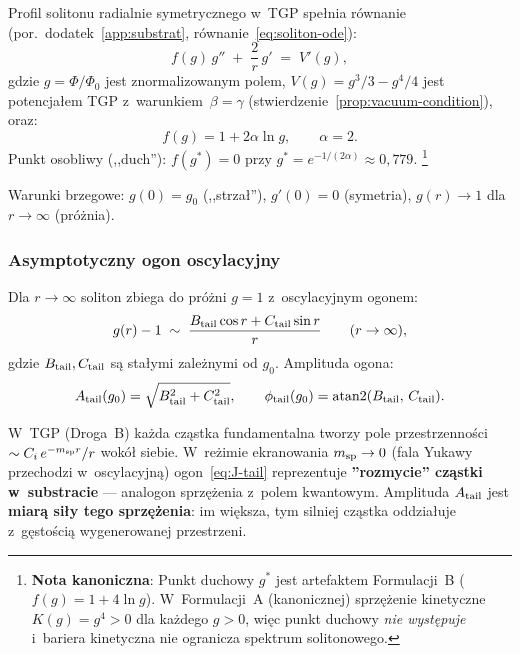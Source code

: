 Profil solitonu radialnie symetrycznego w~TGP spełnia równanie
(por.\ dodatek~\ref{app:substrat}, równanie~\eqref{eq:soliton-ode}):
\begin{equation}\label{eq:J-ode}
  f(g)\,g'' \;+\; \frac{2}{r}\,g' \;=\; V'(g),
\end{equation}
gdzie $g = \Phi/\Phi_0$ jest znormalizowanym polem, $V(g) = g^3/3 - g^4/4$
jest potencjałem TGP z~warunkiem~$\beta = \gamma$ (stwierdzenie~\ref{prop:vacuum-condition}),
oraz:
\begin{equation}\label{eq:J-fg}
  f(g) = 1 + 2\alpha\ln g, \qquad \alpha = 2.
\end{equation}
Punkt osobliwy (,,duch''): $f(g^*) = 0$ przy $g^* = e^{-1/(2\alpha)} \approx 0{,}779$.%
\footnote{\textbf{Nota kanoniczna}: Punkt duchowy $g^*$ jest artefaktem Formulacji~B ($f(g)=1+4\ln g$). W~Formulacji~A (kanonicznej) sprzężenie kinetyczne $K(g) = g^4 > 0$ dla każdego $g > 0$, więc punkt duchowy \emph{nie występuje} i~bariera kinetyczna nie ogranicza spektrum solitonowego.}

Warunki brzegowe: $g(0) = g_0$ (,,strzał''), $g'(0) = 0$ (symetria),
$g(r) \to 1$ dla $r \to \infty$ (próżnia).

\subsubsection{Asymptotyczny ogon oscylacyjny}

Dla $r \to \infty$ soliton zbiega do próżni $g = 1$ z~oscylacyjnym ogonem:
\begin{equation}\label{eq:J-tail}
  g(r) - 1 \;\sim\; \frac{B_{\rm tail}\cos r + C_{\rm tail}\sin r}{r}
  \qquad (r \to \infty),
\end{equation}
gdzie $B_{\rm tail}, C_{\rm tail}$ są stałymi zależnymi od $g_0$.
Amplituda ogona:
\begin{equation}\label{eq:J-Atail}
  A_{\rm tail}(g_0) = \sqrt{B_{\rm tail}^2 + C_{\rm tail}^2},
  \qquad
  \phi_{\rm tail}(g_0) = \mathrm{atan2}(B_{\rm tail},\, C_{\rm tail}).
\end{equation}

\begin{remark}\label{rem:J-Atail-fiz}
W~TGP (Droga~B) każda cząstka fundamentalna tworzy pole przestrzenności
$\sim C_i\,e^{-m_{\rm sp} r}/r$ wokół siebie. W~reżimie ekranowania
$m_{\rm sp} \to 0$ (fala Yukawy przechodzi w~oscylacyjną) ogon~\eqref{eq:J-tail}
reprezentuje \textbf{''rozmycie'' cząstki w~substracie} --- analogon
sprzężenia z~polem kwantowym. Amplituda $A_{\rm tail}$ jest
\textbf{miarą siły tego sprzężenia}: im większa, tym silniej cząstka
oddziałuje z~gęstością wygenerowanej przestrzeni.
\end{remark}

